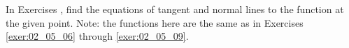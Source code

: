 {\noindent In Exercises}
{, find the equations of tangent and normal lines to the function at the given point. Note: the functions here are the same as in Exercises \ref{exer:02_05_06} through \ref{exer:02_05_09}.
}
